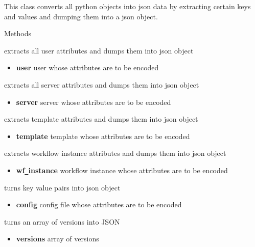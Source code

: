 This class converts all python objects into json data by extracting certain keys and values and dumping
them into a json object.

\begin{methodenv}{Methods}

extracts all user attributes and dumps them into json object
\begin{itemize}
        \item \textbf{user}
        user whose attributes are to be encoded
\end{itemize}

extracts all server attributes and dumps them into json object
\begin{itemize}
        \item \textbf{server}
        server whose attributes are to be encoded
\end{itemize}

extracts template attributes and dumps them into json object
\begin{itemize}
        \item \textbf{template}
        template whose attributes are to be encoded
\end{itemize}

extracts workflow instance attributes and dumps them into json object
\begin{itemize}
        \item \textbf{wf\texttt{\_}instance}
        workflow instance whose attributes are to be encoded
\end{itemize}

turns key value pairs into json object
\begin{itemize}
        \item \textbf{config}
        config file whose attributes are to be encoded
\end{itemize}

turns an array of versions into JSON
\begin{itemize}
        \item \textbf{versions}
        array of versions
\end{itemize}

\end{methodenv}

